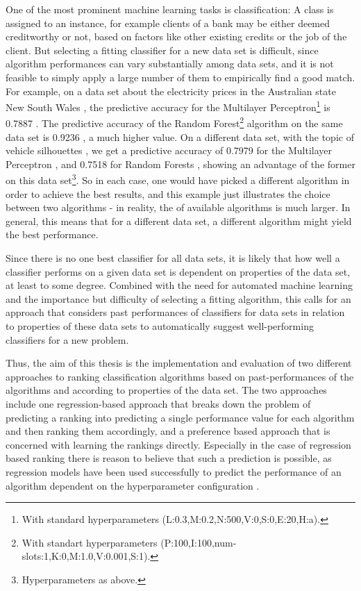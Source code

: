 One of the most prominent machine learning tasks is classification: A class is assigned to an instance, for example clients of a bank may be either deemed creditworthy or not, based on factors like other existing credits or the job of the client. But selecting a fitting classifier for a new data set is difficult, since algorithm performances can vary substantially among data sets, and it is not feasible to simply apply a large number of them to empirically find a good match. For example, on a data set about the electricity prices in the Australian state New South Wales \cite{harris1999splice}, the predictive accuracy for the Multilayer Perceptron\footnote{With standard hyperparameters (L:0.3,M:0.2,N:500,V:0,S:0,E:20,H:a).} is 0.7887 \cite{cachada2017run3}. The predictive accuracy of the Random Forest\footnote{With standart hyperparameters (P:100,I:100,num-slots:1,K:0,M:1.0,V:0.001,S:1).} algorithm on the same data set is 0.9236 \cite{cachada2017run}, a much higher value. On a different data set, with the topic of vehicle silhouettes \cite{siebert1987vehicle}, we get a predictive accuracy of 0.7979 for the Multilayer Perceptron \cite{cachada2017run4}, and 0.7518 for Random Forests \cite{cachada2017run2}, showing an advantage of the former on this data set\footnote{Hyperparameters as above.}. So in each case, one would have picked a different algorithm in order to achieve the best results, and this example just illustrates the choice between two algorithms - in reality, the of available algorithms is much larger. In general, this means that for a different data set, a different algorithm might yield the best performance.

Since there is no one best classifier for all data sets, it is likely that how well a classifier performs on a given data set is dependent on properties of the data set, at least to some degree. Combined with the need for automated machine learning and the importance but difficulty of selecting a fitting algorithm, this calls for an approach that considers past performances of classifiers for data sets in relation to properties of these data sets to automatically suggest well-performing classifiers for a new problem.

Thus, the aim of this thesis is the implementation and evaluation of two different approaches to ranking classification algorithms based on past-performances of the algorithms and according to properties of the data set. The two approaches include one regression-based approach that breaks down the problem of predicting a ranking into predicting a single performance value for each algorithm and then ranking them accordingly, and a preference based approach that is concerned with learning the rankings directly. Especially in the case of regression based ranking there is reason to believe that such a prediction is possible, as regression models have been used successfully to predict the performance of an algorithm dependent on the hyperparameter configuration \cite{DBLP:conf/aaai/EggenspergerHHL15}.


